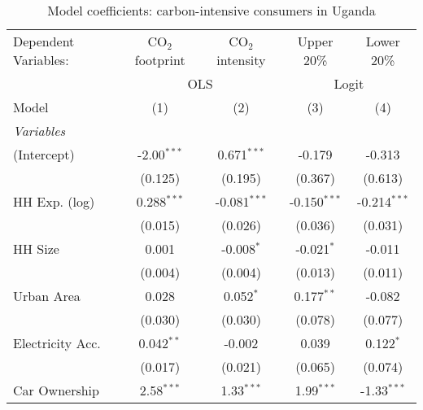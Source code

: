 
\begin{table}[htbp!]
   \centering
   \small
   \begin{adjustbox}{width = 1\textwidth, max height = 0.95\textheight, center}
      \begin{threeparttable}[b]
         \caption{\label{tab:Logit_1_UGA} Model coefficients: carbon-intensive consumers in Uganda}
         \begin{tabular}{lcccc}
            \tabularnewline \midrule \midrule
            Dependent Variables: & CO$_{2}$ footprint & CO$_{2}$ intensity & Upper 20\%     & Lower 20\%\\   
             & \multicolumn{2}{c}{OLS} & \multicolumn{2}{c}{Logit} \\ 
            Model                & (1)                & (2)                & (3)            & (4)\\  
            \midrule
            \emph{Variables}\\
            (Intercept)          & -2.00$^{***}$      & 0.671$^{***}$      & -0.179         & -0.313\\   
                                 & (0.125)            & (0.195)            & (0.367)        & (0.613)\\   
            HH Exp. (log)        & 0.288$^{***}$      & -0.081$^{***}$     & -0.150$^{***}$ & -0.214$^{***}$\\   
                                 & (0.015)            & (0.026)            & (0.036)        & (0.031)\\   
            HH Size              & 0.001              & -0.008$^{*}$       & -0.021$^{*}$   & -0.011\\   
                                 & (0.004)            & (0.004)            & (0.013)        & (0.011)\\   
            Urban Area           & 0.028              & 0.052$^{*}$        & 0.177$^{**}$   & -0.082\\   
                                 & (0.030)            & (0.030)            & (0.078)        & (0.077)\\   
            Electricity Acc.     & 0.042$^{**}$       & -0.002             & 0.039          & 0.122$^{*}$\\   
                                 & (0.017)            & (0.021)            & (0.065)        & (0.074)\\   
            Car Ownership        & 2.58$^{***}$       & 1.33$^{***}$       & 1.99$^{***}$   & -1.33$^{***}$\\   

\end{tabular}
\end{threeparttable}
\end{adjustbox}
\end{table}
